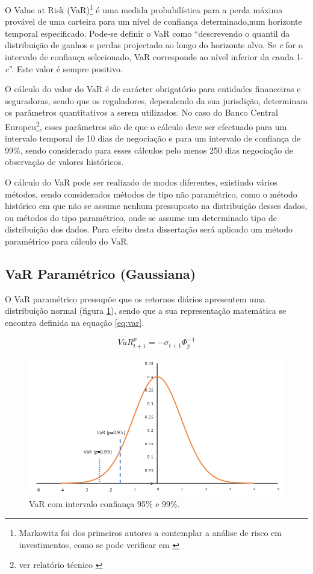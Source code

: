 \documentclass[
  12pt,
  a4paper,
  openany]{book}
\theoremstyle{definition}
\theoremstyle{definition}
\theoremstyle{definition}
\theoremstyle{remark}
\begin{document}
O Value at Risk (VaR)\footnote{Markowitz foi dos primeiros autores a contemplar a análise de risco em investimentos, como se pode verificar em \citet{Markowitz1952}} é uma medida probabilística para a perda máxima provável de uma carteira para um nível de confiança determinado,num horizonte temporal especificado. Pode-se definir o VaR como ``descrevendo o quantil da distribuição de ganhos e perdas projectado ao longo do horizonte alvo. Se \emph{c} for o intervalo de confiança selecionado, VaR corresponde ao nível inferior da cauda 1-\emph{c}''\citep[pp.17]{philippe}. Este valor é sempre positivo.

O cálculo do valor do VaR é de carácter obrigatório para entidades financeiras e seguradoras, sendo que os reguladores, dependendo da sua jurisdição, determinam os parâmetros quantitativos a serem utilizados.
No caso do Banco Central Europeu\footnote{ver relatório técnico \citet{ecb}}, esses parâmetros são de que o cálculo deve ser efectuado para um intervalo temporal de 10 dias de negociação e para um intervalo de confiança de 99\%, sendo considerado para esses cálculos pelo menos 250 dias negociação de observação de valores históricos.

O cálculo do VaR pode ser realizado de modos diferentes, existindo vários métodos, sendo considerados métodos de tipo não paramétrico, como o método histórico em que não se assume nenhum pressuposto na distribuição desses dados, ou métodos do tipo paramétrico, onde se assume um determinado tipo de distribuição dos dados. Para efeito desta dissertação será aplicado um método paramétrico para cálculo do VaR.

\hypertarget{var-paramuxe9trico-gaussiana}{%
\subsection{VaR Paramétrico (Gaussiana)}\label{var-paramuxe9trico-gaussiana}}

O VaR paramétrico pressupõe que os retornos diários apresentem uma distribuição normal (figura \ref{fig:var}), sendo que a sua representação matemática se encontra definida na equação \eqref{eq:var}.

\begin{equation} 
  VaR_{t+1}^{p} = -\sigma_{t+1}\Phi_{p}^{-1}
  \label{eq:var}
\end{equation}


\begin{figure}

{\centering \includegraphics[width=0.6\linewidth]{image/VaR} 

}

\caption{VaR com intervalo confiança 95\% e 99\%.}\label{fig:var}
\end{figure}
\FloatBarrier
\centering
\end{document}
